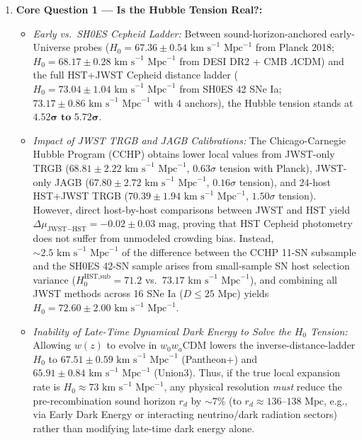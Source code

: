 \documentclass[11pt,letterpaper]{article}
\begin{document}
\begin{enumerate}
    \setlength{\itemsep}{4pt}
    \item \textbf{Core Question 1 — Is the Hubble Tension Real?:}
    \begin{itemize}
        \setlength{\itemsep}{2pt}
        \item \emph{Early vs.\ SH0ES Cepheid Ladder:} Between sound-horizon-anchored early-Universe probes ($H_0 = 67.36 \pm 0.54\text{ km s}^{-1}\text{ Mpc}^{-1}$ from Planck 2018; $H_0 = 68.17 \pm 0.28\text{ km s}^{-1}\text{ Mpc}^{-1}$ from DESI DR2 + CMB $\Lambda$CDM) and the full HST+JWST Cepheid distance ladder ($H_0 = 73.04 \pm 1.04\text{ km s}^{-1}\text{ Mpc}^{-1}$ from SH0ES 42 SNe Ia; $73.17 \pm 0.86\text{ km s}^{-1}\text{ Mpc}^{-1}$ with 4 anchors), the Hubble tension stands at $\mathbf{4.52}\boldsymbol{\sigma}\textbf{ to }\mathbf{5.72}\boldsymbol{\sigma}$.
        \item \emph{Impact of JWST TRGB and JAGB Calibrations:} The Chicago-Carnegie Hubble Program (CCHP) obtains lower local values from JWST-only TRGB ($68.81 \pm 2.22\text{ km s}^{-1}\text{ Mpc}^{-1}$, $0.63\sigma$ tension with Planck), JWST-only JAGB ($67.80 \pm 2.72\text{ km s}^{-1}\text{ Mpc}^{-1}$, $0.16\sigma$ tension), and 24-host HST+JWST TRGB ($70.39 \pm 1.94\text{ km s}^{-1}\text{ Mpc}^{-1}$, $1.50\sigma$ tension). However, direct host-by-host comparisons between JWST and HST yield $\Delta\mu_{\text{JWST}-\text{HST}} = -0.02 \pm 0.03\text{ mag}$, proving that HST Cepheid photometry does not suffer from unmodeled crowding bias. Instead, $\sim 2.5\text{ km s}^{-1}\text{ Mpc}^{-1}$ of the difference between the CCHP 11-SN subsample and the SH0ES 42-SN sample arises from small-sample SN host selection variance ($H_0^{\text{HST,sub}} = 71.2$ vs.\ $73.17\text{ km s}^{-1}\text{ Mpc}^{-1}$), and combining all JWST methods across 16 SNe Ia ($D \le 25\text{ Mpc}$) yields $H_0 = 72.60 \pm 2.00\text{ km s}^{-1}\text{ Mpc}^{-1}$.
        \item \emph{Inability of Late-Time Dynamical Dark Energy to Solve the $H_0$ Tension:} Allowing $w(z)$ to evolve in $w_0 w_a$CDM lowers the inverse-distance-ladder $H_0$ to $67.51 \pm 0.59\text{ km s}^{-1}\text{ Mpc}^{-1}$ (Pantheon+) and $65.91 \pm 0.84\text{ km s}^{-1}\text{ Mpc}^{-1}$ (Union3). Thus, if the true local expansion rate is $H_0 \approx 73\text{ km s}^{-1}\text{ Mpc}^{-1}$, any physical resolution \emph{must} reduce the pre-recombination sound horizon $r_d$ by $\sim 7\%$ (to $r_d \approx 136\text{--}138\text{ Mpc}$, e.g., via Early Dark Energy or interacting neutrino/dark radiation sectors) rather than modifying late-time dark energy alone.

\end{itemize}
\end{enumerate}
\end{document}
